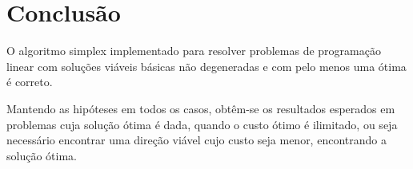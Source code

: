 \documentclass[
	12pt,				%
	openright,			%
	oneside,			%
	a4paper,			%
	english,			%
	french,				%
	spanish,			%
	brazil,				%
	]{abntex2}
\begin{document}
%

\chapter*[Conclusão]{Conclusão}
O algoritmo simplex implementado para resolver problemas de programação linear com 
soluções viáveis básicas não degeneradas e com pelo menos uma ótima é correto.

Mantendo as hipóteses em todos os casos, obtêm-se os resultados esperados em problemas cuja 
solução ótima é dada, quando o custo ótimo é ilimitado, ou seja necessário encontrar uma 
direção viável cujo custo seja menor, encontrando a solução ótima.
%
%
%
%
%
%
%

\postextual



%
%
\end{document}
